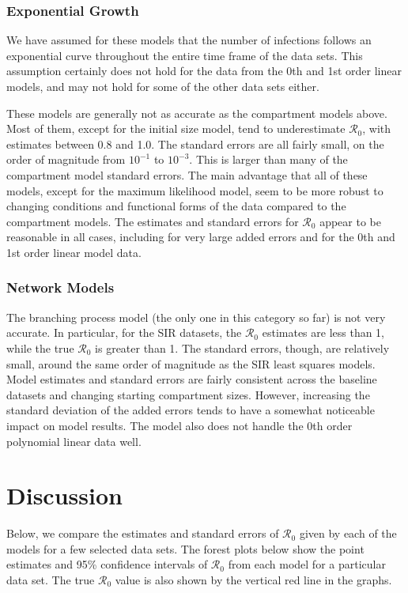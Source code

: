 \documentclass[12pt]{article}
\newcommand{\rr}{\ensuremath{\mathcal{R}_0}}
\begin{document}
\subsubsection{Exponential Growth}

We have assumed for these models that the number of infections follows an exponential curve throughout the entire time frame of the data sets. This assumption certainly does not hold for the data from the 0th and 1st order linear models, and may not hold for some of the other data sets either. 

These models are generally not as accurate as the compartment models above. Most of them, except for the initial size model, tend to underestimate $\rr$, with estimates between 0.8 and 1.0. The standard errors are all fairly small, on the order of magnitude from $10^{-1}$ to $10^{-3}$. This is larger than many of the compartment model standard errors. The main advantage that all of these models, except for the maximum likelihood model, seem to be more robust to changing conditions and functional forms of the data compared to the compartment models. The estimates and standard errors for $\rr$ appear to be reasonable in all cases, including for very large added errors and for the 0th and 1st order linear model data.

\subsubsection{Network Models}

The branching process model (the only one in this category so far) is not very accurate. In particular, for the SIR datasets, the $\rr$ estimates are less than 1, while the true $\rr$ is greater than 1. The standard errors, though, are relatively small, around the same order of magnitude as the SIR least squares models. Model estimates and standard errors are fairly consistent across the baseline datasets and changing starting compartment sizes. However, increasing the standard deviation of the added errors tends to have a somewhat noticeable impact on model results. The model also does not handle the 0th order polynomial linear data well.


\section{Discussion}
\label{sec:dis}

Below, we compare the estimates and standard errors of $\rr$ given by each of the models for a few selected data sets. The forest plots below show the point estimates and 95\% confidence intervals of $\rr$ from each model for a particular data set. The true $\rr$ value is also shown by the vertical red line in the graphs.
\end{document}

